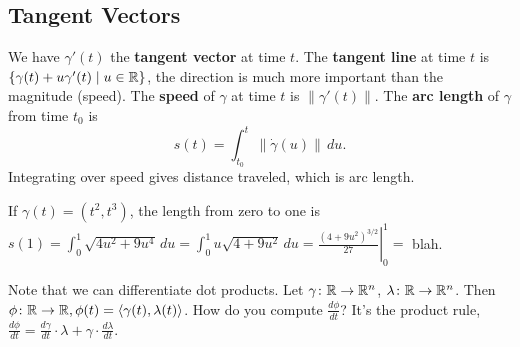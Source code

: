 \subsection{Tangent Vectors}
We have $\gamma '(t)$ the \textbf{tangent vector} at time $t.$ The \textbf{tangent line} at time $t$ is $\{\gamma (t)+ u \gamma '(t)  \mid  u \in \mathbb{R}\} $, the direction is much more important than the magnitude (speed). The \textbf{speed} of $\gamma $ at time $t$ is $\|\gamma '(t)\|$. The \textbf{arc length} of $\gamma $ from time $t_0$ is \[
    s(t)= \int_{t_0}^{t} \| \dot \gamma(u)\| \, du.
\] Integrating over speed gives distance traveled, which is arc length.
\begin{example}
    If $\gamma (t)=(t^2,t^3)$, the length from zero to one is $s(1)= \int_{0}^{1} \sqrt{4u^2+9u^4}  \, du=\int_{0}^{1} u\sqrt{4+9u^2}  \, du=\left. \frac{(4+9u^2)^{3 /2}}{27} \right| ^1_0=$ blah.
\end{example}
Note that we can differentiate dot products. Let $\gamma \colon \mathbb{R} \to \mathbb{R}^n $, $\lambda \colon \mathbb{R} \to \mathbb{R}^n $. Then $\phi \colon \mathbb{R} \to \mathbb{R}, \phi(t)=\langle \gamma (t),\lambda(t) \rangle $. How do you compute $\frac{d \phi}{dt}$? It's the product rule, $\frac{d \phi}{dt}=\frac{d\gamma }{dt}\cdot \lambda + \gamma \cdot \frac{d\lambda}{dt}$.
